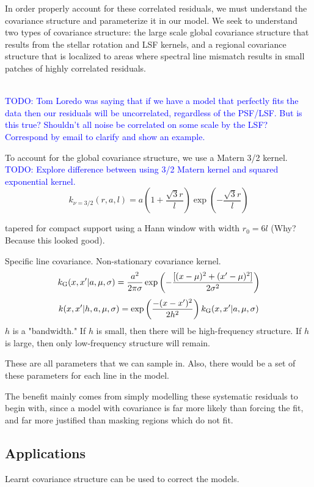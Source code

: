 \documentclass[iop,floatfix]{emulateapj}
\newcommand{\todo}[1]{ \textcolor{Blue}{\\TODO: #1}}
\begin{document}
In order properly account for these correlated residuals, we must understand the covariance structure and parameterize it in our model. We seek to understand two types of covariance structure: the large scale global covariance structure that results from the stellar rotation and LSF kernels, and a regional covariance structure that is localized to areas where spectral line mismatch results in small patches of highly correlated residuals.

\todo{Tom Loredo was saying that if we have a model that perfectly fits the data then our residuals will be uncorrelated, regardless of the PSF/LSF. But is this true? Shouldn't all noise be correlated on some scale by the LSF? Correspond by email to clarify and show an example.}  

To account for the global covariance structure, we use a Matern 3/2 kernel.
\todo{Explore difference between using 3/2 Matern kernel and squared exponential kernel.}
\begin{equation}
  k_{\nu = 3/2}(r, a, l) = a \left(1 + \frac{\sqrt{3} r}{l} \right ) \exp \left (- \frac{\sqrt{3} r}{l} \right )
\end{equation}

tapered for compact support using a Hann window with width $r_0 = 6 l$ (Why? Because this looked good).

Specific line covariance. Non-stationary covariance kernel.
\begin{equation}
  k_{\rm G}(x, x^\prime | a, \mu, \sigma) = \frac{a^2}{2 \pi \sigma} \exp \left ( - \frac{[(x - \mu)^2 + (x^\prime - \mu)^2]}{2 \sigma^2}\right )
\end{equation}
\begin{equation}
k(x, x^\prime | h, a, \mu, \sigma) = \exp \left ( \frac{-( x - x^\prime)^2 }{2 h^2} \right ) k_{\rm G}(x, x^\prime | a, \mu, \sigma)
\end{equation}
$h$ is a "bandwidth." If $h$ is small, then there will be high-frequency structure. If $h$ is large, then only low-frequency structure will remain.

These are all parameters that we can sample in. Also, there would be a set of these parameters for each line in the model.

The benefit mainly comes from simply modelling these systematic residuals to begin with, since a model with covariance is far more likely than forcing the fit, and far more justified than masking regions which do not fit.

\subsection{Applications}
Learnt covariance structure can be used to correct the models.



\end{document}
